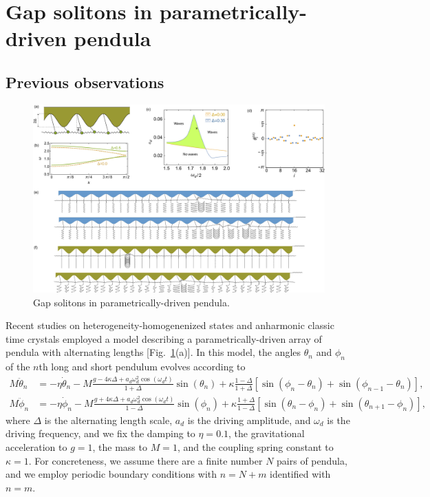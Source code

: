 \documentclass[aps,pre,amsmath,amssymb,floatfix,onecolumn,notitlepage,10pt]{revtex4-1}
\begin{document}
\section{Gap solitons in parametrically-driven pendula}
\subsection{Previous observations}
\begin{figure}[hbt]
\includegraphics[width=\columnwidth]{pendula}
\caption{Gap solitons in parametrically-driven pendula. \label{fig1}}
\end{figure}
Recent studies on heterogeneity-homogenenized states \cite{2021_Nicolaou_1} and anharmonic classic time crystals \cite{2021_Nicolaou_2} employed a model describing a parametrically-driven array of pendula with alternating lengths [Fig.~\ref{fig1}(a)]. In this model, the angles $\theta_n$ and $\phi_n$ of the $n$th long and short pendulum evolves according to
\begin{align}
M \ddot{\theta}_n &= -\eta \dot{\theta}_n-M \frac{g - 4\kappa\Delta +  a_d \omega_d^2 \cos(\omega_d t)}{1+\Delta}\sin(\theta_n) +\kappa \frac{1-\Delta}{1+\Delta} \left[\sin(\phi_n-\theta_n) + \sin(\phi_{n-1}-\theta_n)\right],  \label{pendula1} \\
M \ddot{\phi}_n &= -\eta \dot{\phi}_n-M \frac{g + 4\kappa\Delta +  a_d \omega_d^2 \cos(\omega_d t)}{1-\Delta}\sin(\phi_n) +\kappa \frac{1+\Delta}{1-\Delta} \left[\sin(\theta_n-\phi_n) + \sin(\theta_{n+1}-\phi_n)\right], \label{pendula2}
\end{align}
where $\Delta$ is the alternating length scale, $a_d$ is the driving amplitude, and $\omega_d$ is the driving frequency, and we fix the damping to $\eta=0.1$, the gravitational acceleration to $g=1$, the mass to $M=1$, and the coupling spring constant to $\kappa=1$. For concreteness, we assume there are a finite number $N$ pairs of pendula, and we employ periodic boundary conditions with $n=N+m$ identified with $n=m$.
\end{document}
